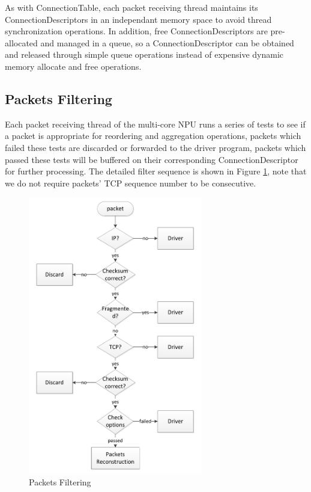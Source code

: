 \documentclass[conference]{IEEEtran}
\begin{document}
As with ConnectionTable, each packet receiving thread maintains its ConnectionDescriptors in an independant memory space to avoid thread synchronization operations. In addition, free ConnectionDescriptors are pre-allocated and managed in a queue, so a ConnectionDescriptor can be obtained and released through simple queue operations instead of expensive dynamic memory allocate and free operations.
\subsection{Packets Filtering}
Each packet receiving thread of the multi-core NPU runs a series of tests to see if a packet is appropriate for reordering and aggregation operations, packets which failed these tests are discarded or forwarded to the driver program, packets which passed these tests will be buffered on their corresponding ConnectionDescriptor for further processing. The detailed filter sequence is shown in Figure \ref{packets filtering}, note that we do not require packets' TCP sequence number to be consecutive.
\begin{figure}[!t]
\centering
\includegraphics[width=3.0in]{filter_packets}
\caption{Packets Filtering}
\label{packets filtering}
\end{figure}
\end{document}
